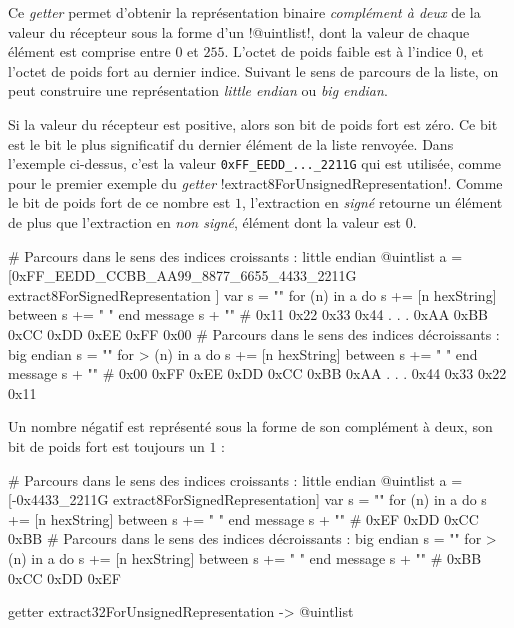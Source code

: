 Ce \emph{getter} permet d'obtenir la représentation binaire \emph{complément à deux} de la valeur du récepteur sous la forme d'un \ggst!@uintlist!, dont la valeur de chaque élément est comprise entre $0$ et $255$. L'octet de poids faible est à l'indice $0$, et l'octet de poids fort au dernier indice. Suivant le sens de parcours de la liste, on peut construire une représentation \emph{little endian} ou \emph{big endian}.

Si la valeur du récepteur est positive, alors son bit de poids fort est zéro. Ce bit est le bit le plus significatif du dernier élément de la liste renvoyée. Dans l'exemple ci-dessus, c'est la valeur \texttt{0xFF\_EEDD\_...\_2211G} qui est utilisée, comme pour le premier exemple du \emph{getter} \ggst!extract8ForUnsignedRepresentation!. Comme le bit de poids fort de ce nombre est $1$, l'extraction en \emph{signé} retourne un élément de plus que l'extraction en \emph{non signé}, élément dont la valeur est $0$.

\begin{galgas3}
# Parcours dans le sens des indices croissants : little endian
@uintlist a = [0xFF_EEDD_CCBB_AA99_8877_6655_4433_2211G
  extract8ForSignedRepresentation
]
var s = ""
for (n) in a
  do s += [n hexString]
  between s += " "
end
message s + "\n" # 0x11 0x22 0x33 0x44 . . . 0xAA 0xBB 0xCC 0xDD 0xEE 0xFF 0x00
# Parcours dans le sens des indices décroissants : big endian
s = ""
for > (n) in a
  do s += [n hexString]
  between s += " "
end
message s + "\n" # 0x00 0xFF 0xEE 0xDD 0xCC 0xBB 0xAA . . . 0x44 0x33 0x22 0x11
\end{galgas3}

Un nombre négatif est représenté sous la forme de son complément à deux, son bit de poids fort est toujours un $1$ :

\begin{galgas3}
# Parcours dans le sens des indices croissants : little endian
@uintlist a = [-0x4433_2211G extract8ForSignedRepresentation]
var s = ""
for (n) in a
  do s += [n hexString]
  between s += " "
end
message s + "\n" # 0xEF 0xDD 0xCC 0xBB
# Parcours dans le sens des indices décroissants : big endian
s = ""
for > (n) in a
  do s += [n hexString]
  between s += " "
end
message s + "\n" # 0xBB 0xCC 0xDD 0xEF
\end{galgas3}


\begin{galgas3box}
getter extract32ForUnsignedRepresentation -> @uintlist
\end{galgas3box}

